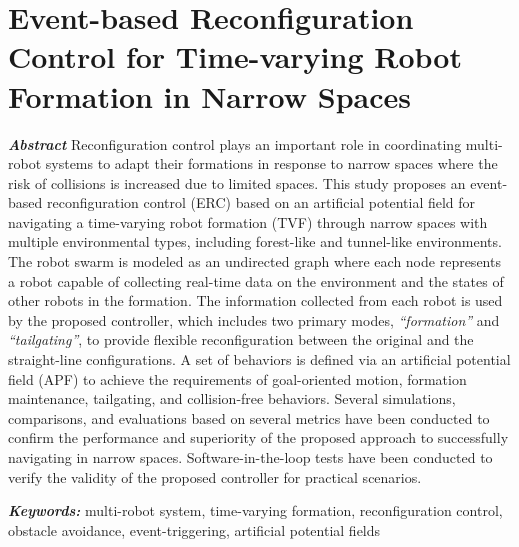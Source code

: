 \chapter{Event-based Reconfiguration Control for Time-varying Robot Formation in Narrow Spaces}\label{paper2}

\vspace{1cm}

\noindent\textit{\textbf{Abstract}}
Reconfiguration control plays an important role in coordinating multi-robot systems to adapt their formations in response to narrow spaces where the risk of collisions is increased due to limited spaces. This study proposes an event-based reconfiguration control (ERC) based on an artificial potential field for navigating a time-varying robot formation (TVF) through narrow spaces with multiple environmental types, including forest-like and tunnel-like environments. The robot swarm is modeled as an undirected graph where each node represents a robot capable of collecting real-time data on the environment and the states of other robots in the formation. The information collected from each robot is used by the proposed controller, which includes two primary modes, \textit{``formation''} and \textit{``tailgating''}, to provide flexible reconfiguration between the original and the straight-line configurations. A set of behaviors is defined via an artificial potential field (APF) to achieve the requirements of goal-oriented motion, formation maintenance, tailgating, and collision-free behaviors. Several simulations, comparisons, and evaluations based on several metrics have been conducted to confirm the performance and superiority of the proposed approach to successfully navigating in narrow spaces. Software-in-the-loop tests have been conducted to verify the validity of the proposed controller for practical scenarios.

\noindent\textbf{\textit{Keywords:}}
multi-robot system, time-varying formation, reconfiguration control, obstacle avoidance, event-triggering, artificial potential fields







